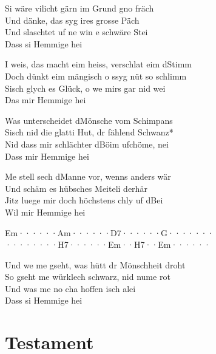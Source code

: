 \documentclass[
  letterpaper,
  twoside=false]{scrbook}
\begin{document}
Si wäre vilicht gärn im Grund gno fräch\\
Und dänke, das syg ires grosse Päch\\
Und s\textquotesingle laschtet uf ne win e schwäre Stei\\
Dass si Hemmige hei

I weis, das macht eim heiss, verschlat eim d\textquotesingle Stimm\\
Doch dünkt eim mängisch o s\textquotesingle syg nüt so schlimm\\
S\textquotesingle isch glych es Glück, o we mirs gar nid wei\\
Das mir Hemmige hei

Was unterscheidet d\textquotesingle Mönsche vom Schimpans\\
S\textquotesingle isch nid die glatti Hut, dr fählend Schwanz*\\
Nid dass mir schlächter d\textquotesingle Böim ufchöme, nei\\
Dass mir Hemmige hei

Me stell sech d\textquotesingle Manne vor, wenns anders wär\\
Und s\textquotesingle chäm es hübsches Meiteli derhär\\
Jitz luege mir doch höchstens chly uf d\textquotesingle Bei\\
Wil mir Hemmige hei

\textbar Em······\textbar Am······\textbar D7······\textbar G·······\textbar{}\\
\textbar········\textbar H7······\textbar Em··H7··\textbar Em······\textbar{}

Und we me gseht, was hütt dr Mönschheit droht\\
So gseht me würklech schwarz, nid nume rot\\
Und was me no cha hoffen isch alei\\
Dass si Hemmige hei

\hypertarget{testament}{%
\chapter{Testament}\label{testament}}
\end{document}
